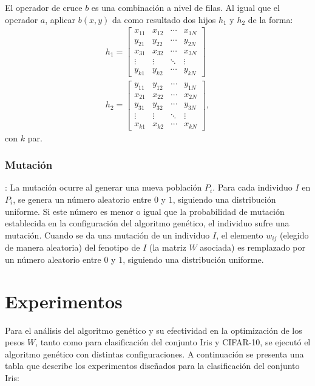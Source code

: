\documentclass[conference]{IEEEtran}
\begin{document}
  El operador de cruce $b$ es una combinación a nivel de filas.
  Al igual que el operador $a$, aplicar $b(x,y)$ da como resultado dos hijos $h_1$ y $h_2$ de la forma: 
   \begin{eqnarray}
  h_1 = \begin{bmatrix}
x_{11} & x_{12} & \cdots  & x_{1N}\\ 
y_{21} & y_{22} &\cdots  & y_{2N}\\
x_{31} & x_{32} & \cdots & x_{3N} \\
 \vdots & \vdots  & \ddots &\vdots\\ 
y_{k1} & y_{k2} & \cdots  & y_{kN}
\end{bmatrix}
\\
h_2 = \begin{bmatrix}
y_{11} & y_{12} & \cdots  & y_{1N}\\ 
x_{21} & x_{22} &\cdots  & x_{2N}\\
y_{31} & y_{32} & \cdots & y_{3N} \\
 \vdots & \vdots  & \ddots &\vdots\\ 
x_{k1} & x_{k2} & \cdots  & x_{kN}
\end{bmatrix}, 
  \end{eqnarray}
con $k$ par.

\subsubsection{Mutación}:
 	La mutación ocurre al generar una nueva población $P_i$. Para cada individuo $I$ en $P_i$, se genera un número aleatorio entre $0$ y $1$, siguiendo una distribución uniforme. Si este número es menor o igual que la probabilidad de mutación establecida en la configuración del algoritmo genético, el individuo sufre una mutación.
    Cuando se da una mutación de un individuo $I$, el elemento $w_{ij}$ (elegido de manera aleatoria) del fenotipo de $I$ (la matriz $W$ asociada) es remplazado por un número aleatorio entre $0$ y $1$, siguiendo una distribución uniforme. 
    
\section{Experimentos}

Para el análisis del algoritmo genético y su efectividad en la optimización de los pesos $W$, tanto como para clasificación del conjunto Iris y CIFAR-10, se ejecutó el algoritmo genético con distintas configuraciones. A continuación se presenta una tabla que describe los experimentos diseñados para la clasificación del conjunto Iris: 
\end{document}

